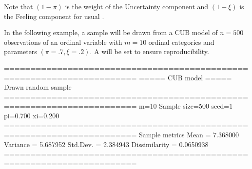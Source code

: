 \documentclass[letterpaper,10pt,english]{sphinxmanual}
\begin{document}
\sphinxAtStartPar
Note that \((1-\pi)\) is the weight of the Uncertainty component and
\((1-\xi)\) is the Feeling component for usual .

\sphinxAtStartPar
In the following example, a sample will be drawn from a CUB model of \(n=500\) observations of an ordinal
variable with \(m=10\) ordinal categories
and parameters \((\pi=.7, \xi=.2)\). A  will be set to ensure reproducibility.
\def\sphinxLiteralBlockLabel{\label{\detokenize{manual:id2}}}
\begin{sphinxVerbatim}[commandchars=\\\{\},numbers=left,firstnumber=1,stepnumber=1]
    
     

     
                  
\end{sphinxVerbatim}

\begin{sphinxVerbatim}[commandchars=\\\{\}]
=======================================================================
=====\PYGZgt{}\PYGZgt{}\PYGZgt{} CUB model \PYGZlt{}\PYGZlt{}\PYGZlt{}===== Drawn random sample
=======================================================================
m=10  Sample size=500  seed=1
pi=0.700
xi=0.200
=======================================================================
Sample metrics
Mean     = 7.368000
Variance = 5.687952
Std.Dev. = 2.384943
\PYGZhy{}\PYGZhy{}\PYGZhy{}\PYGZhy{}\PYGZhy{}\PYGZhy{}\PYGZhy{}\PYGZhy{}\PYGZhy{}\PYGZhy{}\PYGZhy{}\PYGZhy{}\PYGZhy{}\PYGZhy{}\PYGZhy{}\PYGZhy{}\PYGZhy{}\PYGZhy{}\PYGZhy{}\PYGZhy{}\PYGZhy{}\PYGZhy{}\PYGZhy{}\PYGZhy{}\PYGZhy{}\PYGZhy{}\PYGZhy{}\PYGZhy{}\PYGZhy{}\PYGZhy{}\PYGZhy{}\PYGZhy{}\PYGZhy{}\PYGZhy{}\PYGZhy{}\PYGZhy{}\PYGZhy{}\PYGZhy{}\PYGZhy{}\PYGZhy{}\PYGZhy{}\PYGZhy{}\PYGZhy{}\PYGZhy{}\PYGZhy{}\PYGZhy{}\PYGZhy{}\PYGZhy{}\PYGZhy{}\PYGZhy{}\PYGZhy{}\PYGZhy{}\PYGZhy{}\PYGZhy{}\PYGZhy{}\PYGZhy{}\PYGZhy{}\PYGZhy{}\PYGZhy{}\PYGZhy{}\PYGZhy{}\PYGZhy{}\PYGZhy{}\PYGZhy{}\PYGZhy{}\PYGZhy{}\PYGZhy{}\PYGZhy{}\PYGZhy{}\PYGZhy{}\PYGZhy{}
Dissimilarity = 0.0650938
=======================================================================
\end{sphinxVerbatim}
\end{document}
